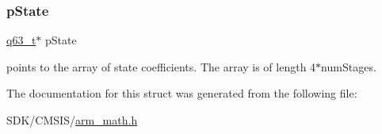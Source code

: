 \subsubsection{\texorpdfstring{p\+State}{pState}}
{\footnotesize\ttfamily \mbox{\hyperlink{arm__math_8h_a5aea1cb12fc02d9d44c8abf217eaa5c6}{q63\+\_\+t}}$\ast$ p\+State}

points to the array of state coefficients. The array is of length 4$\ast$num\+Stages. 

The documentation for this struct was generated from the following file\+:\begin{DoxyCompactItemize}
\item 
S\+D\+K/\+C\+M\+S\+I\+S/\mbox{\hyperlink{arm__math_8h}{arm\+\_\+math.\+h}}\end{DoxyCompactItemize}
